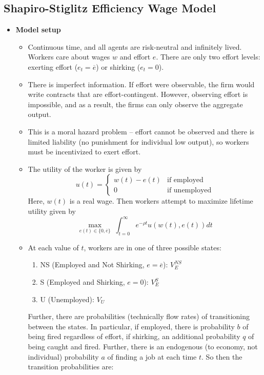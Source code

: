 \documentclass[12pt]{article}
\begin{document}
\subsection{Shapiro-Stiglitz Efficiency Wage Model}

\begin{itemize}
    \item \textbf{Model setup}
    \begin{itemize}
        \item Continuous time, and all agents are risk-neutral and infinitely lived. Workers care about wages $w$ and effort $e$. There are only two effort levels: exerting effort ($e_t = \overline{e}$) or shirking ($e_t = 0$). 
        \item There is imperfect information. If effort were observable, the firm would write contracts that are effort-contingent. However, observing effort is impossible, and as a result, the firms can only observe the aggregate output. 
        \item This is a moral hazard problem -- effort cannot be observed and there is limited liability (no punishment for individual low output), so workers must be incentivized to exert effort.
        \item The utility of the worker is given by
        \[u(t) = \begin{cases}
        w(t) - e(t) & \text{if employed} \\
        0 & \text{if unemployed}
        \end{cases}\]
        Here, $w(t)$ is a real wage. Then workers attempt to maximize lifetime utility given by
        \[\max_{e(t) \in \{0, \overline{e}\}}\; \int_{t=0}^{\infty} e^{-\rho t}u(w(t), e(t))dt\]
        \item At each value of $t$, workers are in one of three possible states:
        \begin{enumerate}
            \item NS (Employed and Not Shirking, $e = \overline{e}$): $V_E^{NS}$
            \item S (Employed and Shirking, $e = 0$): $V_E^S$ 
            \item U (Unemployed): $V_U$
        \end{enumerate}
        Further, there are probabilities (technically flow rates) of transitioning between the states. In particular, if employed, there is probability $b$ of being fired regardless of effort, if shirking, an additional probability $q$ of being caught and fired. Further, there is an endogenous (to economy, not individual) probability $a$ of finding a job at each time $t$. So then the transition probabilities are:

\end{itemize}
\end{itemize}
\end{document}
